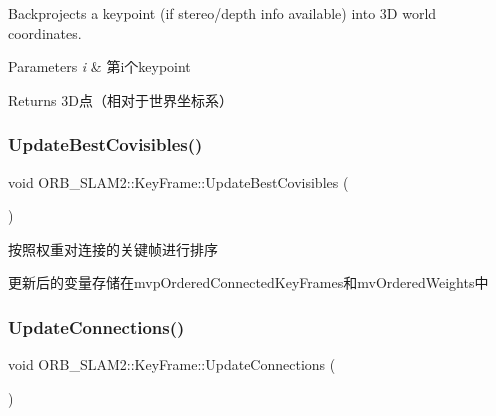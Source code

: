 Backprojects a keypoint (if stereo/depth info available) into 3D world coordinates. 


\begin{DoxyParams}{Parameters}
{\em i} & 第i个keypoint \\
\hline
\end{DoxyParams}
\begin{DoxyReturn}{Returns}
3\+D点（相对于世界坐标系） 
\end{DoxyReturn}
\mbox{\label{class_o_r_b___s_l_a_m2_1_1_key_frame_a09cb8502509c136536bf8d45793f8872}} 
\subsubsection{\texorpdfstring{Update\+Best\+Covisibles()}{UpdateBestCovisibles()}}
{\footnotesize\ttfamily void O\+R\+B\+\_\+\+S\+L\+A\+M2\+::\+Key\+Frame\+::\+Update\+Best\+Covisibles (\begin{DoxyParamCaption}{ }\end{DoxyParamCaption})}



按照权重对连接的关键帧进行排序 

更新后的变量存储在mvp\+Ordered\+Connected\+Key\+Frames和mv\+Ordered\+Weights中 \mbox{\label{class_o_r_b___s_l_a_m2_1_1_key_frame_afe7026956c91d4e0a01812be9dc7e8d5}} 
\subsubsection{\texorpdfstring{Update\+Connections()}{UpdateConnections()}}
{\footnotesize\ttfamily void O\+R\+B\+\_\+\+S\+L\+A\+M2\+::\+Key\+Frame\+::\+Update\+Connections (\begin{DoxyParamCaption}{ }\end{DoxyParamCaption})}



